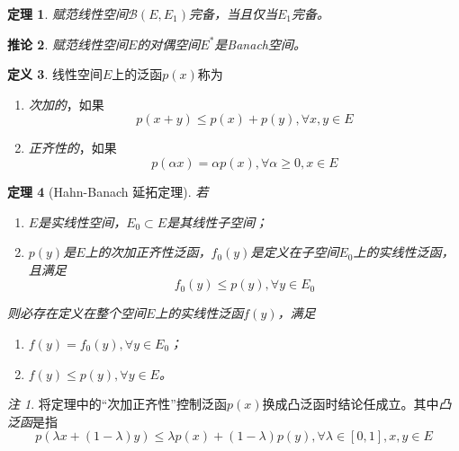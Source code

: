 \documentclass[winfonts,UTF8,c5size,a4paper,fancyhdr,hyperref,titlepage,nocap]{ctexart}
\theoremstyle{question}
\theoremstyle{theorem}
\newtheorem{thm}{定理}
\newtheorem{cor}[thm]{推论}
\theoremstyle{definition}
\newtheorem{defn}[thm]{定义}
\theoremstyle{remark}
\newtheorem*{rem}{注}
\numberwithin{equation}{subsection}
\newcommand{\red}{\color{red}}
\begin{document}
\begin{thm}
  赋范线性空间$\mathcal{B}(E,E_1)$完备，当且仅当$E_1$完备。
\end{thm}
\begin{cor}
  赋范线性空间$E$的对偶空间$E^{\ast}$是Banach空间。
\end{cor}

\begin{defn}
线性空间$E$上的泛函$p(x)$称为
\begin{enumerate}[1)]
    \setlength{\itemindent}{2ex}
    \item \emph{\red 次加的}，如果
        \begin{equation*}
        p(x+y)\leqslant p(x)+p(y),\forall x,y\in E
        \end{equation*}
    \item \emph{\red 正齐性的}，如果
        \begin{equation*}
        p(\alpha x)=\alpha p(x), \forall\alpha\geqslant0,x\in E
        \end{equation*}
\end{enumerate}
\end{defn}




\begin{thm}[Hahn-Banach 延拓定理]
若
\begin{enumerate}[1)]
    \setlength{\itemindent}{2ex}
    \item $E$是实线性空间，$E_0\subset E$是其线性子空间；
    \item $p(y)$是$E$上的次加正齐性泛函，$f_0(y)$是定义在子空间$E_0$上的实线性泛函，且满足
      \begin{equation*}
        f_0(y)\leqslant p(y), \forall y\in E_0
      \end{equation*}
\end{enumerate}
则必存在定义在整个空间$E$上的实线性泛函$f(y)$，满足
\begin{enumerate}[1)]
    \setlength{\itemindent}{2ex}
    \item $f(y)=f_0(y), \forall y\in E_0$；
    \item $f(y)\leqslant p(y),\forall y\in E$。
\end{enumerate}
\end{thm}
\begin{rem}
  将定理中的``次加正齐性''控制泛函$p(x)$换成凸泛函时结论任成立。其中\emph{\red 凸泛函}是指
  \begin{equation*}
  p(\lambda x+(1-\lambda)y)\leqslant\lambda p(x)+(1-\lambda)p(y), \forall\lambda\in[0,1],x,y\in E
  \end{equation*}
\end{rem}
\end{document}
